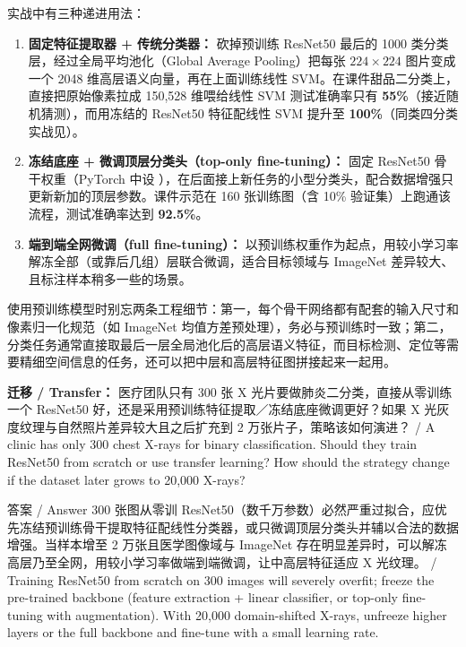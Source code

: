 实战中有三种递进用法：
\begin{enumerate}
\item \textbf{固定特征提取器 + 传统分类器：} 砍掉预训练 ResNet50 最后的 1000 类分类层，经过全局平均池化（Global Average Pooling）把每张 $224\times 224$ 图片变成一个 2048 维高层语义向量，再在上面训练线性 SVM。在课件甜品二分类上，直接把原始像素拉成 150,528 维喂给线性 SVM 测试准确率只有 \textbf{55\%}（接近随机猜测），而用冻结的 ResNet50 特征配线性 SVM 提升至 \textbf{100\%}（同类四分类实战见）。
\item \textbf{冻结底座 + 微调顶层分类头（top-only fine-tuning）：} 固定 ResNet50 骨干权重（PyTorch 中设 ），在后面接上新任务的小型分类头，配合数据增强只更新新加的顶层参数。课件示范在 160 张训练图（含 10\% 验证集）上跑通该流程，测试准确率达到 \textbf{92.5\%}。
\item \textbf{端到端全网微调（full fine-tuning）：} 以预训练权重作为起点，用较小学习率解冻全部（或靠后几组）层联合微调，适合目标领域与 ImageNet 差异较大、且标注样本稍多一些的场景。
\end{enumerate}

使用预训练模型时别忘两条工程细节：第一，每个骨干网络都有配套的输入尺寸和像素归一化规范（如 ImageNet 均值方差预处理），务必与预训练时一致；第二，分类任务通常直接取最后一层全局池化后的高层语义特征，而目标检测、定位等需要精细空间信息的任务，还可以把中层和高层特征图拼接起来一起用。

\textbf{迁移 / Transfer：} 医疗团队只有 300 张 X 光片要做肺炎二分类，直接从零训练一个 ResNet50 好，还是采用预训练特征提取／冻结底座微调更好？如果 X 光灰度纹理与自然照片差异较大且之后扩充到 2 万张片子，策略该如何演进？ / A clinic has only 300 chest X-rays for binary classification. Should they train ResNet50 from scratch or use transfer learning? How should the strategy change if the dataset later grows to 20,000 X-rays?

\begin{StudySolution}{答案 / Answer}
300 张图从零训 ResNet50（数千万参数）必然严重过拟合，应优先冻结预训练骨干提取特征配线性分类器，或只微调顶层分类头并辅以合法的数据增强。当样本增至 2 万张且医学图像域与 ImageNet 存在明显差异时，可以解冻高层乃至全网，用较小学习率做端到端微调，让中高层特征适应 X 光纹理。 / Training ResNet50 from scratch on 300 images will severely overfit; freeze the pre-trained backbone (feature extraction + linear classifier, or top-only fine-tuning with augmentation). With 20,000 domain-shifted X-rays, unfreeze higher layers or the full backbone and fine-tune with a small learning rate.
\end{StudySolution}

